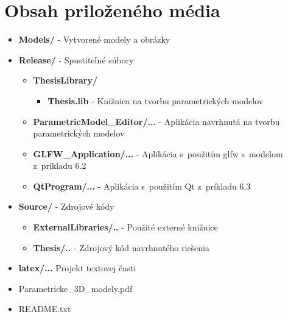  \renewcommand\labelitemii{$\square$}
 \renewcommand\labelitemiii{$\circ$}
\chapter{Obsah priloženého média}
\begin{itemize}
\item \textbf{Models/} - Vytvorené modely a obrázky
\item \textbf{Release/} - Spustiteľné súbory
\begin{itemize}
    \item \textbf{ThesisLibrary/}
    \begin{itemize}
        \item \textbf{Thesis.lib} - Knižnica na tvorbu parametrických modelov
    \end{itemize}
    \item \textbf{ParametricModel\_Editor/...} - Aplikácia navrhnutá na tvorbu parametrických modelov
    \item \textbf{GLFW\_Application/...} - Aplikácia s~použitím glfw s~modelom z~príkladu 6.2
    \item \textbf{QtProgram/...} - Aplikácia s~použitím Qt z~príkladu 6.3
\end{itemize}  
\item \textbf{Source/} - Zdrojové kódy
\begin{itemize}
    \item \textbf{ExternalLibraries/..} - Použité externé knižnice
    \item \textbf{Thesis/..} - Zdrojový kód navrhnutého riešenia
\end{itemize}
\item \textbf{latex/...} Projekt textovej časti
\item Parametricke\_3D\_modely.pdf
\item README.txt
\end{itemize}

